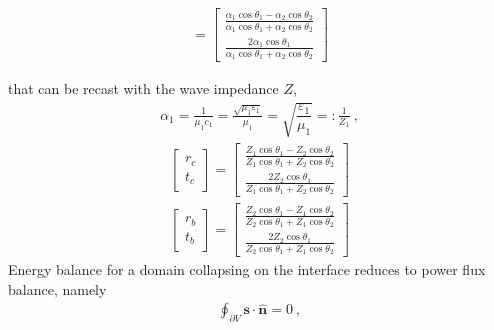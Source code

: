 \documentclass[letterpaper,10pt,italian]{jupyterBook}
\begin{document}
\begin{equation*}
\begin{split}
= \begin{bmatrix} \frac{\alpha_1 \cos \theta_1 - \alpha_2 \cos \theta_2}{\alpha_1 \cos \theta_1 + \alpha_2 \cos \theta_2} \\ \frac{2 \alpha_1 \cos \theta_1}{\alpha_1 \cos \theta_1 + \alpha_2 \cos \theta_2} \end{bmatrix}
\end{split}
\end{equation*}


\sphinxAtStartPar
that can be recast with the wave impedance \(Z\),
\begin{equation*}
\begin{split}\alpha_1 = \frac{1}{\mu_1 c_1} = \frac{\sqrt{\mu_1 \varepsilon_1}}{\mu_1} = \sqrt{\dfrac{\varepsilon_1}{\mu_1}} =: \frac{1}{Z_1} \ ,\end{split}
\end{equation*}\begin{equation*}
\begin{split}
\begin{bmatrix} r_c \\ t_c \end{bmatrix} = \begin{bmatrix} \frac{Z_1 \cos \theta_1 - Z_2 \cos \theta_2}{Z_1 \cos \theta_1 + Z_2 \cos \theta_2} \\ \frac{2 Z_2 \cos \theta_1}{Z_1 \cos \theta_1 + Z_2 \cos \theta_2} \end{bmatrix}
\end{split}
\end{equation*}\begin{equation*}
\begin{split}
\begin{bmatrix} r_b \\ t_b \end{bmatrix} = \begin{bmatrix} \frac{Z_2 \cos \theta_1 - Z_1 \cos \theta_2}{Z_2 \cos \theta_1 + Z_1 \cos \theta_2} \\ \frac{2 Z_2 \cos \theta_1}{Z_2 \cos \theta_1 + Z_1 \cos \theta_2} \end{bmatrix}
\end{split}
\end{equation*}
\sphinxAtStartPar
{} Energy balance for a domain collapsing on the interface reduces to power flux balance, namely
\begin{equation*}
\begin{split}\oint_{\partial V} \mathbf{s} \cdot \hat{\mathbf{n}} = 0 \ ,\end{split}
\end{equation*}
\end{document}
